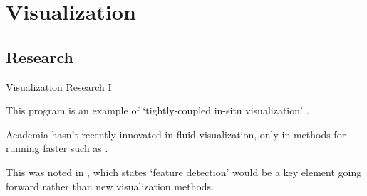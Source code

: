 \section{Visualization}
\subsection{Research}

\begin{frame}{Visualization Research I}
\begin{wideitemize}
    \item This program is an example of `tightly-coupled in-situ visualization' \parencite{kress2017situ}.
    \item Academia hasn't recently innovated in fluid visualization, only in methods for running faster such as \parencite{efficientStreamConstruction}.
    \item This was noted in \parencite{vizRole2004}, which states `feature detection' would be a key element going forward rather than new visualization methods.
\end{wideitemize}
\end{frame}

